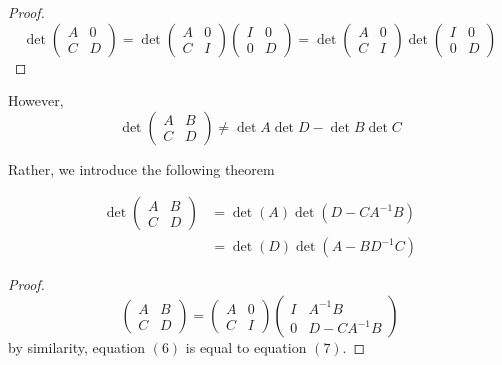 \documentclass{article}
\begin{document}
    \begin{proof}
    \[ \det{\begin{pmatrix}
    A&0\\C&D 
    \end{pmatrix}} = \det{\begin{pmatrix}
    A&0\\C&I
    \end{pmatrix} \begin{pmatrix}
    I&0\\0&D
    \end{pmatrix}} = \det{\begin{pmatrix}
    A&0\\C&I
    \end{pmatrix}} \det{\begin{pmatrix}
    I&0\\0&D
    \end{pmatrix}}\]
    \end{proof}

    However, 
    \[\det{\begin{pmatrix}
    A&B\\C&D
    \end{pmatrix}} \neq \det{A} \det{D} - \det{B} \det{C}\]

    Rather, we introduce the following theorem

    \begin{theorem}
    \begin{align}
        \det{\begin{pmatrix} A&B\\C&D \end{pmatrix}}  & = \det{(A)} \det{(D - C A^{-1} B)} \\
        & = \det{(D)} \det{(A - B D^{-1} C)}
    \end{align}
    \end{theorem}
    \begin{proof}
    \[\begin{pmatrix} A&B\\C&D\end{pmatrix} = \begin{pmatrix}
    A&0\\C&I\end{pmatrix} \begin{pmatrix}
    I& A^{-1} B \\ 0 & D - C A^{-1} B
    \end{pmatrix}\]
    by similarity, equation $(6)$ is equal to equation $(7)$. 
    \end{proof}
\end{document}
